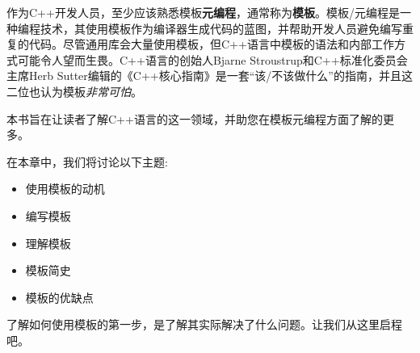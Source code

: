 作为C++开发人员，至少应该熟悉模板\textbf{元编程}，通常称为\textbf{模板}。模板/元编程是一种编程技术，其使用模板作为编译器生成代码的蓝图，并帮助开发人员避免编写重复的代码。尽管通用库会大量使用模板，但C++语言中模板的语法和内部工作方式可能令人望而生畏。C++语言的创始人Bjarne Stroustrup和C++标准化委员会主席Herb Sutter编辑的《C++核心指南》是一套“该/不该做什么”的指南，并且这二位也认为模板\textit{非常可怕}。

本书旨在让读者了解C++语言的这一领域，并助您在模板元编程方面了解的更多。

在本章中，我们将讨论以下主题:

\begin{itemize}
\item
使用模板的动机

\item
编写模板

\item
理解模板

\item
模板简史

\item
模板的优缺点
\end{itemize}

了解如何使用模板的第一步，是了解其实际解决了什么问题。让我们从这里启程吧。








